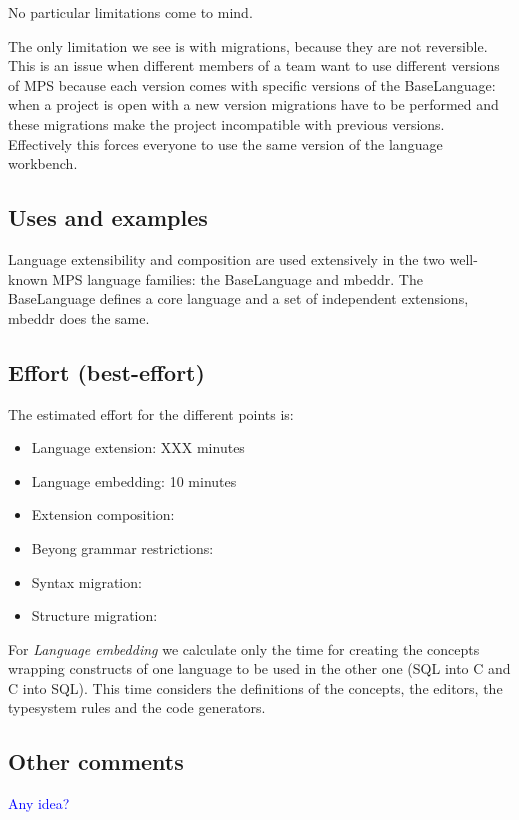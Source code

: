 \documentclass[preprint,numbers,10pt]{sigplanconf}
\newcommand\comment[1]{\textcolor{blue}{#1}}
\begin{document}
No particular limitations come to mind.

The only limitation we see is with migrations, because they are not reversible. This is an issue when different members of a team want to use different versions of MPS because each version comes with specific versions of the BaseLanguage: when a project is open with a new version migrations have to be performed and these migrations make the project incompatible with previous versions. Effectively this forces everyone to use the same version of the language workbench.

\subsection{Uses and examples}

Language extensibility and composition are used extensively in the two well-known MPS language families: the BaseLanguage and mbeddr. The BaseLanguage defines a core language and a set of independent extensions, mbeddr does the same.

\subsection{Effort (best-effort)}

The estimated effort for the different points is:

\begin{itemize}
	\item Language extension: XXX minutes
	\item Language embedding: 10 minutes
	\item Extension composition:
	\item Beyong grammar restrictions:
	\item Syntax migration:
	\item Structure migration:
\end{itemize}

For \emph{Language embedding} we calculate only the time for creating the concepts wrapping constructs of one language to be used in the other one (SQL into C and C into SQL). This time considers the definitions of the concepts, the editors, the typesystem rules and the code generators.

\subsection{Other comments}

\comment{Any idea?}
\end{document}
